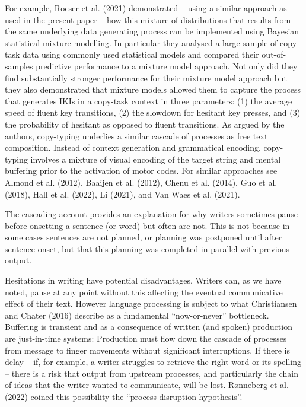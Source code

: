 \documentclass[
  man,floatsintext]{apa7}
\begin{document}
For example, Roeser et al. (2021) demonstrated -- using a similar approach as used in the present paper -- how this mixture of distributions that results from the same underlying data generating process can be implemented using Bayesian statistical mixture modelling. In particular they analysed a large sample of copy-task data using commonly used statistical models and compared their out-of-samples predictive performance to a mixture model approach. Not only did they find substantially stronger performance for their mixture model approach but they also demonstrated that mixture models allowed them to capture the process that generates IKIs in a copy-task context in three parameters: (1) the average speed of fluent key transitions, (2) the slowdown for hesitant key presses, and (3) the probability of hesitant as opposed to fluent transitions. As argued by the authors, copy-typing underlies a similar cascade of processes as free text composition. Instead of context generation and grammatical encoding, copy-typing involves a mixture of visual encoding of the target string and mental buffering prior to the activation of motor codes. For similar approaches see Almond et al. (2012), Baaijen et al. (2012), Chenu et al. (2014), Guo et al. (2018), Hall et al. (2022), Li (2021), and Van Waes et al. (2021).

The cascading account provides an explanation for why writers sometimes pause before onsetting a sentence (or word) but often are not. This is not because in some cases sentences are not planned, or planning was postponed until after sentence onset, but that this planning was completed in parallel with previous output.

Hesitations in writing have potential disadvantages. Writers can, as we have noted, pause at any point without this affecting the eventual communicative effect of their text. However language processing is subject to what Christiansen and Chater (2016) describe as a fundamental \enquote{now-or-never} bottleneck. Buffering is transient and as a consequence of written (and spoken) production are just-in-time systems: Production must flow down the cascade of processes from message to finger movements without significant interruptions. If there is delay -- if, for example, a writer struggles to retrieve the right word or its spelling -- there is a risk that output from upstream processes, and particularly the chain of ideas that the writer wanted to communicate, will be lost. Rønneberg et al. (2022) coined this possibility the \enquote{process-disruption hypothesis}.
\end{document}
